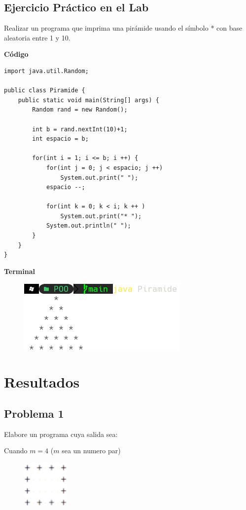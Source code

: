 \documentclass[11pt, twocolumn]{article}
\newcommand{\linejump}{\hfill \break}
\begin{document}
    \subsection*{Ejercicio Práctico en el Lab}
    Realizar un programa que imprima una pirámide usando el símbolo * con base aleatoria entre 1 y 10.

    \linejump
    \textbf{Código}
    \begin{lstlisting}
import java.util.Random;

public class Piramide {
    public static void main(String[] args) {
        Random rand = new Random();

        int b = rand.nextInt(10)+1;
        int espacio = b;
        
        for(int i = 1; i <= b; i ++) {
            for(int j = 0; j < espacio; j ++)
                System.out.print(" ");            
            espacio --;

            for(int k = 0; k < i; k ++ )
                System.out.print("* ");
            System.out.println(" ");
        }
    }
}
    \end{lstlisting}

    \textbf{Terminal}
    \begin{figure}[ht]
        \includegraphics[width=0.75\columnwidth, center]{Pb.png}
    \end{figure}

    \section*{Resultados}
    \subsection*{Problema 1}
    Elabore un programa cuya salida sea:

    Cuando $m = 4$ ($m$ sea un numero par)
    \begin{figure}[ht]
        \includegraphics[width=0.25\columnwidth, center]{Cuadrado1.png}
    \end{figure}
    
\end{document}
